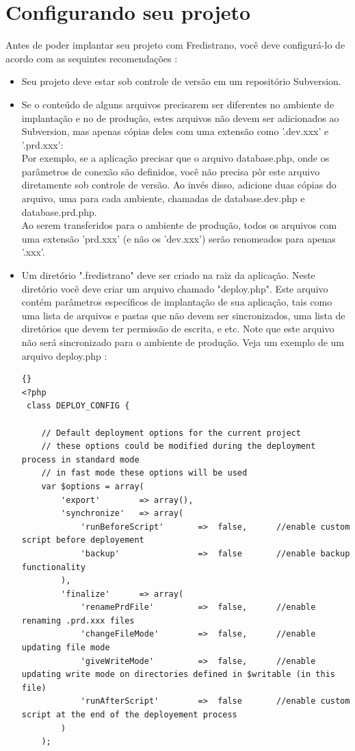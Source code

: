 \documentclass[12pt,a4paper]{report}
\begin{document}
\section{Configurando seu projeto}\label{precimportantes}
Antes de poder implantar seu projeto com Fredistrano, você deve configurá-lo de acordo com as sequintes recomendações :\\
\begin{itemize}
\item Seu projeto deve estar sob controle de versão em um repositório Subversion.\\
\item Se o conteúdo de alguns arquivos precisarem ser diferentes no ambiente de implantação e no de produção, estes arquivos não devem ser adicionados ao Subversion, mas apenas cópias deles com uma extensão como '.dev.xxx' e '.prd.xxx':\\
Por exemplo, se a aplicação precisar que o arquivo database.php, onde os parâmetros de conexão são definidos, você não precisa pôr este arquivo diretamente sob controle de versão.  Ao invés disso, adicione duas cópias do arquivo, uma para cada ambiente, chamadas de database.dev.php e database.prd.php.\\ 
Ao serem transferidos para o ambiente de produção, todos os arquivos com uma extensão 'prd.xxx' (e não os 'dev.xxx') serão renomeados para apenas '.xxx'.
\item Um diretório ".fredistrano" deve ser criado na raiz da aplicação.  Neste diretório você deve criar um arquivo chamado "deploy.php".  Este arquivo contém parâmetros específicos de implantação de sua aplicação, tais como uma lista de arquivos e pastas que não devem ser sincronizados, uma lista de diretórios que devem ter permissão de escrita, e etc.  Note que este arquivo não será sincronizado para o ambiente de produção.  Veja um exemplo de um arquivo deploy.php :\\

\lstset{language=Php}
\lstset{breaklines=true}
\lstset{tabsize=2}
\lstset{commentstyle=\textit}
\begin{lstlisting}[frame=tb]{}
<?php
 class DEPLOY_CONFIG {
	
	// Default deployment options for the current project
	// these options could be modified during the deployment process in standard mode
	// in fast mode these options will be used
 	var $options = array(
 		'export' 		=> array(),
 		'synchronize'	=> array(
 		 	'runBeforeScript'		=> 	false, 		//enable custom script before deployement 
 			'backup'				=> 	false 		//enable backup functionality
 		),
 		'finalize'		=> array(
	 		'renamePrdFile' 		=> 	false,		//enable renaming .prd.xxx files
			'changeFileMode' 		=> 	false,		//enable updating file mode
			'giveWriteMode'			=> 	false,		//enable updating write mode on directories defined in $writable (in this file)
 			'runAfterScript'		=> 	false		//enable custom script at the end of the deployement process
 		)
 	);
 	

\end{lstlisting}
\end{itemize}
\end{document}
